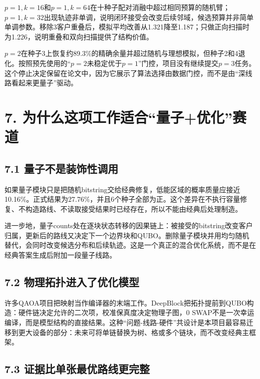 \documentclass[
  10.5pt,
  UTF8]{ctexart}
\begin{document}
\(p=1,k=16\)和\(p=1,k=64\)在十种子配对消融中超过相同预算的随机臂；\(p=1,k=32\)出现轨迹非单调，说明闭环接受会改变后续邻域，候选预算并非简单单调参数。移除3客户重叠后，模拟平均改善从1.321降至1.187；只做正向扫描时为1.226，说明重叠和双向扫描提供了结构价值。

\(p=2\)在种子3上恢复约89.3\%的精确余量并超过随机与理想模拟，但种子2和4退化。按照预先使用的``\(p=2\)未稳定优于\(p=1\)''门控，项目没有继续提交\(p=3\)任务。这个停止决定保留在论文中，因为它展示了算法选择由数据门控，而不是由``深线路看起来更量子''驱动。

\section{7. 为什么这项工作适合``量子+优化''赛道}\label{ux4e3aux4ec0ux4e48ux8fd9ux9879ux5de5ux4f5cux9002ux5408ux91cfux5b50ux4f18ux5316ux8d5bux9053}

\subsection{7.1 量子不是装饰性调用}\label{ux91cfux5b50ux4e0dux662fux88c5ux9970ux6027ux8c03ux7528}

如果量子模块只是把随机bitstring交给经典修复，低能区域的概率质量应接近10.16\%。正式结果为27.76\%，并且6个种子全部为正。这个差异在不执行容量修复、不构造路线、不读取接受结果时已经存在，所以不能由经典后处理制造。

进一步地，量子counts处在逐块状态转移的因果链上：被接受的bitstring改变客户归属，更新后的路线又决定下一个边界块和QUBO。删除量子模块并用均匀随机替代，会同时改变候选分布和后续轨迹。这是一个真正的混合优化系统，而不是在经典答案生成后附加一段量子线路。

\subsection{7.2 物理拓扑进入了优化模型}\label{ux7269ux7406ux62d3ux6251ux8fdbux5165ux4e86ux4f18ux5316ux6a21ux578b}

许多QAOA项目把映射当作编译器的末端工作。DeepBlock把拓扑提前到QUBO构造：硬件链决定允许的二次项，校准保真度决定物理子图，0 SWAP不是一次幸运编译，而是模型结构的直接结果。这种``问题-线路-硬件''共设计是本项目最容易迁移到更大设备的部分：未来可将单链替换为树、格或多个链块，而不改变经典主框架。

\subsection{7.3 证据比单张最优路线更完整}\label{ux8bc1ux636eux6bd4ux5355ux5f20ux6700ux4f18ux8defux7ebfux66f4ux5b8cux6574}
\end{document}
